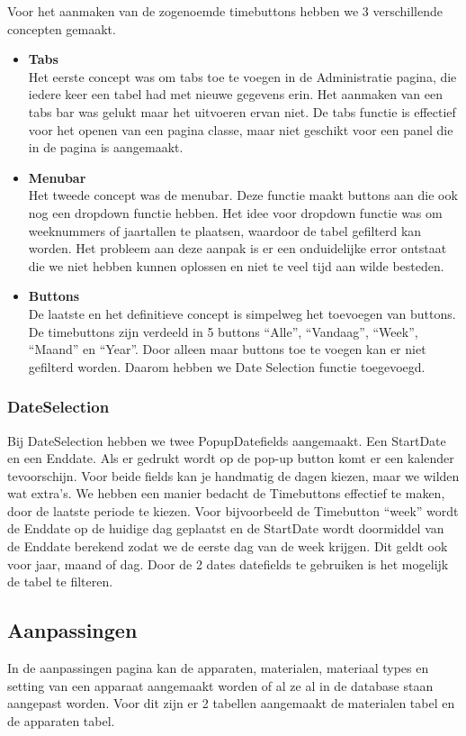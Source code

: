 Voor het aanmaken van de zogenoemde timebuttons hebben we 3 verschillende concepten gemaakt.
\begin {itemize}
\item \textbf{Tabs}\\
Het eerste concept was om tabs toe te voegen in de Administratie pagina, die iedere keer een tabel had met nieuwe gegevens erin. Het aanmaken van een tabs bar was gelukt maar het uitvoeren ervan niet. De tabs functie is effectief voor het openen van een pagina classe, maar niet geschikt voor een panel die in de pagina is aangemaakt. 

\item \textbf{Menubar}\\
Het tweede concept was de menubar. Deze functie maakt buttons aan die ook nog een dropdown functie hebben. Het idee voor dropdown functie was om weeknummers of jaartallen te plaatsen, waardoor de tabel gefilterd kan worden. Het probleem aan deze aanpak is er een onduidelijke error ontstaat die we niet hebben kunnen oplossen en niet te veel tijd aan wilde besteden.

\item \textbf{Buttons}\\
De laatste en het definitieve concept is simpelweg het toevoegen van buttons. De timebuttons zijn verdeeld in 5 buttons ``Alle'', ``Vandaag'', ``Week'', ``Maand'' en ``Year''. Door alleen maar buttons toe te voegen kan er niet gefilterd worden. Daarom hebben we Date Selection functie toegevoegd.
\end {itemize}

\subsubsection{DateSelection}
Bij DateSelection hebben we twee PopupDatefields aangemaakt. Een StartDate en een Enddate. Als er gedrukt wordt op de pop-up button komt er een kalender tevoorschijn. Voor beide fields kan je handmatig de dagen kiezen, maar we wilden wat extra’s. 
We hebben een manier bedacht de Timebuttons effectief te maken, door de laatste periode te kiezen. Voor bijvoorbeeld de Timebutton ``week'' wordt de Enddate op de huidige dag geplaatst en de StartDate wordt doormiddel van de Enddate berekend zodat we de eerste dag van de week krijgen. Dit geldt ook voor jaar, maand of dag. 
Door de 2 dates datefields te gebruiken is het mogelijk de tabel te filteren.

\subsection{Aanpassingen}
In de aanpassingen pagina kan de apparaten, materialen, materiaal types en setting van een apparaat aangemaakt worden of al ze al in de database staan aangepast worden. Voor dit zijn er 2 tabellen aangemaakt de materialen tabel en de apparaten tabel.

